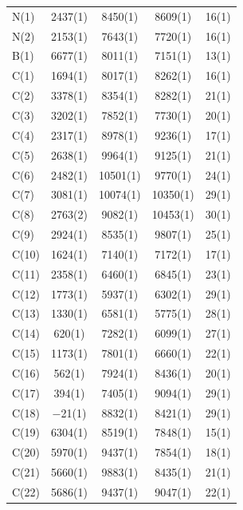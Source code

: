 \twocolumn
\begin{center}
\tablelasttail{\bottomrule} 
 {\footnotesize \singlespacing
\begin{supertabular}{lcccc}
N(1)&2437(1)&8450(1)&8609(1)&16(1)\\
N(2)&2153(1)&7643(1)&7720(1)&16(1)\\
B(1)&6677(1)&8011(1)&7151(1)&13(1)\\
C(1)&1694(1)&8017(1)&8262(1)&16(1)\\
C(2)&3378(1)&8354(1)&8282(1)&21(1)\\
C(3)&3202(1)&7852(1)&7730(1)&20(1)\\
C(4)&2317(1)&8978(1)&9236(1)&17(1)\\
C(5)&2638(1)&9964(1)&9125(1)&21(1)\\
C(6)&2482(1)&10501(1)&9770(1)&24(1)\\
C(7)&3081(1)&10074(1)&10350(1)&29(1)\\
C(8)&2763(2)&9082(1)&10453(1)&30(1)\\
C(9)&2924(1)&8535(1)&9807(1)&25(1)\\
C(10)&1624(1)&7140(1)&7172(1)&17(1)\\
C(11)&2358(1)&6460(1)&6845(1)&23(1)\\
C(12)&1773(1)&5937(1)&6302(1)&29(1)\\
C(13)&1330(1)&6581(1)&5775(1)&28(1)\\
C(14)&620(1)&7282(1)&6099(1)&27(1)\\
C(15)&1173(1)&7801(1)&6660(1)&22(1)\\
C(16)&562(1)&7924(1)&8436(1)&20(1)\\
C(17)&394(1)&7405(1)&9094(1)&29(1)\\
C(18)&$-$21(1)&8832(1)&8421(1)&29(1)\\
C(19)&6304(1)&8519(1)&7848(1)&15(1)\\
C(20)&5970(1)&9437(1)&7854(1)&18(1)\\
C(21)&5660(1)&9883(1)&8435(1)&21(1)\\
C(22)&5686(1)&9437(1)&9047(1)&22(1)\\

\end{supertabular}}
\end{center}
